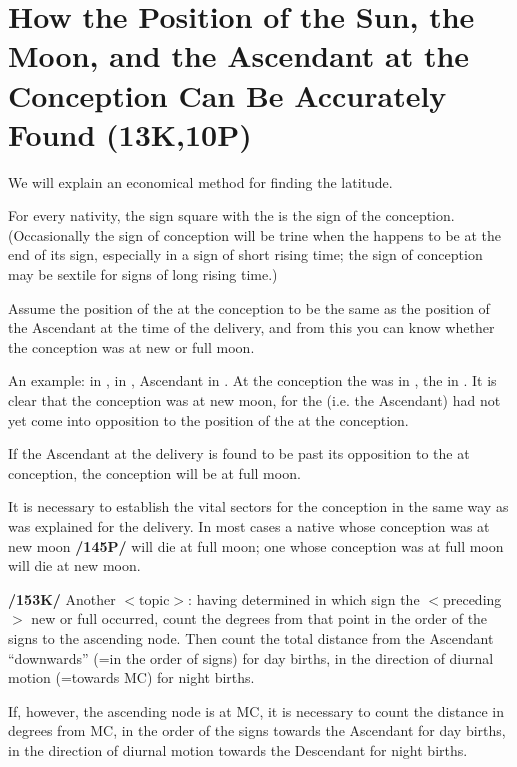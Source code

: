 \section{How the Position of the Sun, the Moon, and the Ascendant at the Conception Can Be Accurately Found (13K,10P)}

We will explain an economical method for finding the latitude. 

For every nativity, the sign square with the \Sun\xspace is the sign of the conception. (Occasionally the sign of conception will be trine when the \Sun\xspace happens to be at the end of its sign, especially in a sign of short rising time; the sign of conception may be sextile for signs of long rising time.) 

Assume the position of the \Moon\xspace at the conception to be the same as the position of the Ascendant at the time of the delivery, and from this you can know whether the conception was at new or full moon.

An example: \Sun\xspace in \Aquarius, \Moon\xspace in \Scorpio, Ascendant in \Virgo. At the conception the \Sun\xspace was
in \Taurus, the \Moon\xspace in \Virgo. It is clear that the conception was at new moon, for the \Moon\xspace (i.e. the
Ascendant) had not yet come into opposition to the position of the \Sun\xspace at the conception. 

If the Ascendant at the delivery is found to be past its opposition to the \Sun\xspace at conception, the conception will be at full moon.

It is necessary to establish the vital sectors for the conception in the same way as was explained for the delivery. In most cases a native whose conception was at new moon \textbf{/145P/} will die at full moon; one whose conception was at full moon will die at new moon.

\textbf{/153K/} Another $<$topic$>$: having determined in which sign the $<$preceding$>$ new or full \Moon\xspace occurred, count the degrees from that point in the order of the signs to the ascending node. Then count the total distance from the Ascendant “downwards” (=in the order of signs) for day births, in the direction of diurnal motion (=towards MC) for night births. 

If, however, the ascending node is at MC, it is necessary to count the distance in degrees from MC, in the order of the signs towards the Ascendant for day births, in the direction of diurnal motion towards the Descendant for night births. 

